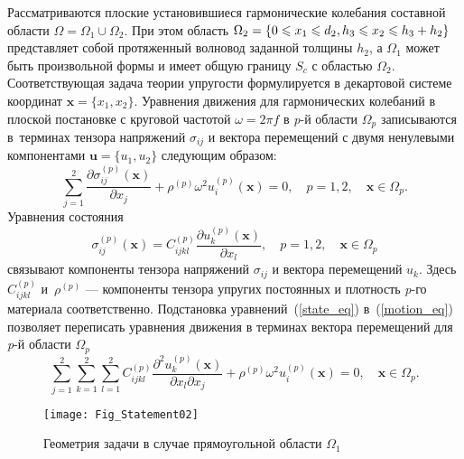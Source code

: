 \documentclass[press]{vestnik}
\begin{document}
Рассматриваются плоские установившиеся гармонические колебания составной области $\Omega = \Omega_1 \cup \Omega_2$. При этом область $\Omega_2 = \{0 \leqslant x_{1} \leqslant d_{2},  h_{3} \dm \leqslant x_{2}\leqslant h_{3}+h_{2}\} $ представляет собой протяженный волновод заданной толщины $h_{2}$, а $\Omega_{1}$ может быть произвольной формы и имеет общую границу $S_{c}$ с областью $\Omega_{2}$. Соответствующая задача теории упругости формулируется в декартовой системе координат $\bm{x} =\{x_1, x_2\}$. Уравнения движения для гармонических колебаний в плоской постановке с круговой частотой $\omega=2 \pi f$ в \textit{p}-й области $\Omega_{p}$ записываются в~терминах тензора напряжений $\sigma_{ij}$ и вектора перемещений с двумя ненулевыми компонентами $\bm{u}=\{u_{1}, u_{2}\}$ следующим образом:
\begin{equation} \label{motion_eq}
	\sum_{j=1}^{2} \frac{\partial \sigma_{ij}^{(p)}(\bm{x})}{\partial x_{j}} + \rho^{(p)} \omega^{2} u_{i}^{(p)}(\bm{x})=0, \quad p=1,2, \quad \bm{x} \in \Omega_{p}.
\end{equation}
Уравнения состояния 
\begin{equation} \label{state_eq}
	\sigma_{ij}^{(p)}(\bm{x})=C_{ijkl}^{(p)} \frac{\partial u_{k}^{(p)}(\bm{x})}{\partial x_{l}}, \quad p=1,2, \quad \bm{x} \in \Omega_{p}
\end{equation}
связывают компоненты тензора напряжений $\sigma_{ij}$ и вектора перемещений $u_{k}$. Здесь $C_{ijkl}^{(p)}$ и~$\rho^{(p)}$ --- компоненты тензора упругих постоянных и плотность \textit{p}-го материала соответственно. Подстановка уравнений~(\ref{state_eq}) в~(\ref{motion_eq}) позволяет переписать уравнения движения в терминах вектора перемещений для \textit{p}-й области $\Omega_{p}$
\begin{equation} \label{motion_eq_u}
	\sum_{j=1}^{2} \sum_{k=1}^{2} \sum_{l=1}^{2} C_{ijkl}^{(p)} \frac{\partial^{2} u_{k}^{(p)}(\bm{x})}{\partial x_{l} \partial x_{j}} + \rho^{(p)} \omega^{2} u_{i}^{(p)}(\bm{x})=0, \quad \bm{x} \in \Omega_{p}.
\end{equation}

\begin{figure}
	\begin{center}
		\texttt{[image: Fig\_Statement02]}
		\caption{Геометрия задачи в случае прямоугольной области $\Omega_{1}$} 
		\label{Fig_Statement02}
	\end{center}
\end{figure}
\end{document}
